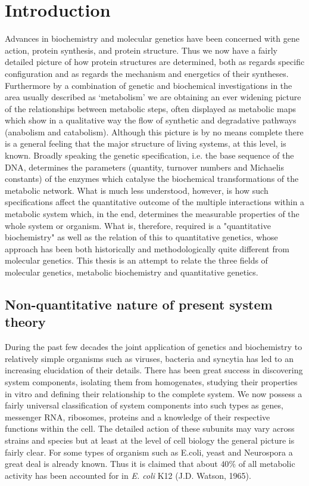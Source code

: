 
\renewcommand*{\thesection}{\Roman{section}.}
\renewcommand*{\thesubsection}{\arabic{section}.\arabic{subsection}}

\chapter*{Introduction}

Advances in biochemistry and molecular genetics have been concerned with gene action, protein synthesis, and protein structure. Thus we now have a fairly detailed picture of how protein structures are determined, both as regards specific configuration and as regards the mechanism and energetics of their syntheses. Furthermore by a combination of genetic and biochemical investigations in the area usually described as `metabolism' we are obtaining an ever widening picture of the relationships between metabolic steps, often displayed as metabolic maps which show in a qualitative way the flow of synthetic and degradative pathways (anabolism and catabolism). Although this picture is by no means complete there is a general feeling that the major structure of living systems, at this level, is known. Broadly speaking the genetic specification, i.e. the base sequence of the DNA, determines the parameters (quantity, turnover numbers and Michaelis constants) of the enzymes which catalyse the biochemical transformations of the metabolic network. What is much less understood, however, is how such specifications affect the quantitative outcome of the multiple interactions within a metabolic system which, in the end, determines the measurable properties of the whole system or organism. What is, therefore, required is a "quantitative biochemistry" as well as the relation of this to quantitative genetics, whose approach has been both historically and methodologically quite different from molecular genetics. This thesis is an attempt to relate the three fields of molecular genetics, metabolic biochemistry and quantitative genetics.

\section{Non-quantitative nature of present system theory}

During the past few decades the joint application of genetics and biochemistry to relatively simple organisms such as viruses, bacteria and syncytia has led to an increasing elucidation of their details. There has been great success in discovering system components, isolating them from homogenates, studying their properties in vitro and defining their relationship to the complete system. We now possess a fairly universal classification of system components into such types as genes, messenger RNA, ribosomes, proteins and a knowledge of their respective functions within the cell. The detailed action of these subunits may vary across strains and species but at least at the level of cell biology the general picture is fairly clear. For some types of organism such as E.coli, yeast and Neurospora a great deal is already known. Thus it is claimed that about $40 \%$ of all metabolic activity has been accounted for in {\em E. coli} K12 (J.D. Watson, 1965).

